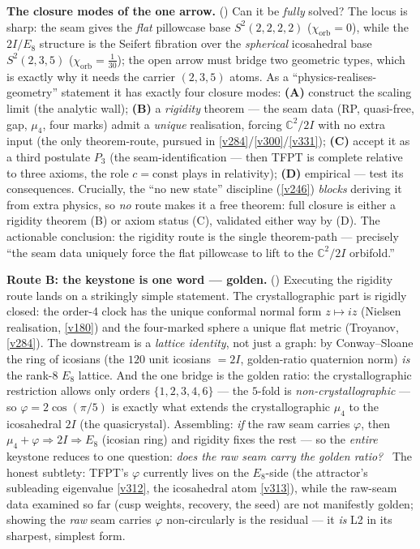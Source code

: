 \documentclass[11pt,a4paper]{article}
\begin{document}
\par\smallskip\noindent\textbf{The closure modes of the one arrow.} ()
Can it be \emph{fully} solved? The locus is sharp: the seam gives the \emph{flat} pillowcase base $S^2(2,2,2,2)$
($\chi_{\mathrm{orb}}=0$),
while the $2I/E_8$ structure is the Seifert fibration over the \emph{spherical} icosahedral base $S^2(2,3,5)$
($\chi_{\mathrm{orb}}=\tfrac1{30}$); the open arrow must bridge two geometric types, which is exactly why it needs
the carrier $(2,3,5)$ atoms. As a ``physics-realises-geometry'' statement it has exactly four closure modes:
\textbf{(A)} construct the scaling limit (the analytic wall); \textbf{(B)} a \emph{rigidity} theorem --- the seam
data (RP, quasi-free, gap, $\mu_4$, four marks) admit a \emph{unique} realisation, forcing $\mathbb{C}^2/2I$ with no
extra input (the only theorem-route, pursued in \vref{v284}/\vref{v300}/\vref{v331}); \textbf{(C)} accept it as a
third postulate $P_3$ (the seam-identification --- then TFPT is complete relative to three axioms, the role
$c{=}$const plays in relativity); \textbf{(D)} empirical --- test its consequences. Crucially, the ``no new state''
discipline (\vref{v246}) \emph{blocks} deriving it from extra physics, so \emph{no} route makes it a free theorem:
full closure is either a rigidity theorem (B) or axiom status (C), validated either way by (D). The actionable
conclusion: the rigidity route is the single theorem-path --- precisely ``the seam data uniquely force the flat
pillowcase to lift to the $\mathbb{C}^2/2I$ orbifold.''

\par\smallskip\noindent\textbf{Route B: the keystone is one word --- golden.} ()
Executing the rigidity route lands on a strikingly simple statement. The crystallographic part is rigidly closed:
the order-4 clock has the unique conformal normal form $z\mapsto iz$ (Nielsen realisation, \vref{v180}) and the
four-marked sphere a unique flat metric (Troyanov, \vref{v284}). The downstream is a \emph{lattice identity}, not
just a graph: by Conway--Sloane the ring of icosians (the $120$ unit icosians $=2I$, golden-ratio quaternion norm)
\emph{is} the rank-$8$ $E_8$ lattice. And the one bridge is the golden ratio: the crystallographic restriction
allows only orders $\{1,2,3,4,6\}$ --- the $5$-fold is \emph{non-crystallographic} --- so $\varphi=2\cos(\pi/5)$ is
exactly what extends the crystallographic $\mu_4$ to the icosahedral $2I$ (the quasicrystal). Assembling: \emph{if}
the raw seam carries $\varphi$, then $\mu_4+\varphi\Rightarrow 2I\Rightarrow E_8$ (icosian ring) and rigidity fixes
the rest --- so the \emph{entire} keystone reduces to one question: \emph{does the raw seam carry the golden ratio?}
\mO\ The honest subtlety: TFPT's $\varphi$ currently lives on the $E_8$-side (the attractor's subleading eigenvalue
\vref{v312}, the icosahedral atom \vref{v313}), while the raw-seam data examined so far (cusp weights, recovery,
the seed) are not manifestly golden; showing the \emph{raw} seam carries $\varphi$ non-circularly is the residual
--- it \emph{is} L2 in its sharpest, simplest form.
\end{document}
